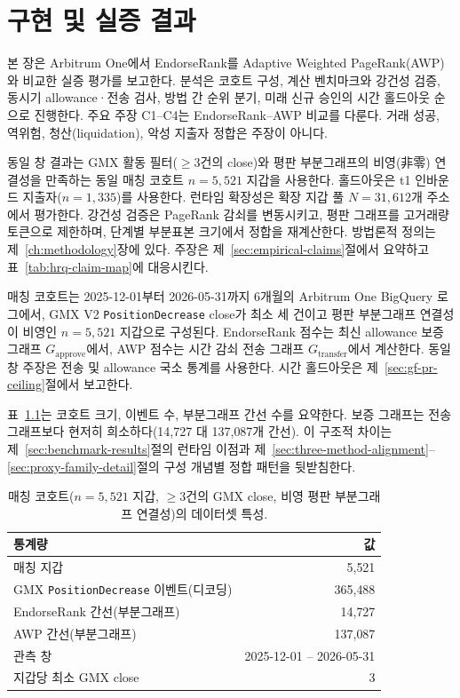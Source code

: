 ﻿%
\chapter{구현 및 실증 결과}
\label{ch:results}

본 장은 Arbitrum One에서 EndorseRank를 Adaptive Weighted PageRank(AWP)와 비교한 실증 평가를 보고한다. 분석은 코호트 구성, 계산 벤치마크와 강건성 검증, 동시기 allowance·전송 검사, 방법 간 순위 분기, 미래 신규 승인의 시간 홀드아웃 순으로 진행한다. 주요 주장 C1--C4는 EndorseRank--AWP 비교를 다룬다. 거래 성공, 역위험, 청산(liquidation), 악성 지출자 정합은 주장이 아니다.

동일 창 결과는 GMX 활동 필터($\geq 3$건의 close)와 평판 부분그래프의 비영(非零) 연결성을 만족하는 동일 매칭 코호트 $n=5{,}521$ 지갑을 사용한다. 홀드아웃은 t1 인바운드 지출자($n=1{,}335$)를 사용한다. 런타임 확장성은 확장 지갑 풀 $N=31{,}612$개 주소에서 평가한다. 강건성 검증은 PageRank 감쇠를 변동시키고, 평판 그래프를 고거래량 토큰으로 제한하며, 단계별 부분표본 크기에서 정합을 재계산한다. 방법론적 정의는 제~\ref{ch:methodology}장에 있다. 주장은 제~\ref{sec:empirical-claims}절에서 요약하고 표~\ref{tab:hrq-claim-map}에 대응시킨다.


매칭 코호트는 2025-12-01부터 2026-05-31까지 6개월의 Arbitrum One BigQuery 로그에서, GMX V2 \texttt{PositionDecrease} close가 최소 세 건이고 평판 부분그래프 연결성이 비영인 $n=5{,}521$ 지갑으로 구성된다. EndorseRank 점수는 최신 allowance 보증 그래프 $G_{\text{approve}}$에서, AWP 점수는 시간 감쇠 전송 그래프 $G_{\text{transfer}}$에서 계산한다. 동일 창 주장은 전송 및 allowance 국소 통계를 사용한다. 시간 홀드아웃은 제~\ref{sec:gf-pr-ceiling}절에서 보고한다.

표~\ref{tab:dataset-stats}는 코호트 크기, 이벤트 수, 부분그래프 간선 수를 요약한다. 보증 그래프는 전송 그래프보다 현저히 희소하다(14{,}727 대 137{,}087개 간선). 이 구조적 차이는 제~\ref{sec:benchmark-results}절의 런타임 이점과 제~\ref{sec:three-method-alignment}--\ref{sec:proxy-family-detail}절의 구성 개념별 정합 패턴을 뒷받침한다.

\begin{table}[htbp]
\centering
\caption{매칭 코호트($n=5{,}521$ 지갑, $\geq 3$건의 GMX close, 비영 평판 부분그래프 연결성)의 데이터셋 특성.}
\label{tab:dataset-stats}
\begin{tabular}{lr}
\toprule
통계량 & 값 \\
\midrule
매칭 지갑 & 5{,}521 \\
GMX \texttt{PositionDecrease} 이벤트(디코딩) & 365{,}488 \\
EndorseRank 간선(부분그래프) & 14{,}727 \\
AWP 간선(부분그래프) & 137{,}087 \\
관측 창 & 2025-12-01 -- 2026-05-31 \\
지갑당 최소 GMX close & 3 \\
\bottomrule
\end{tabular}
\end{table}

